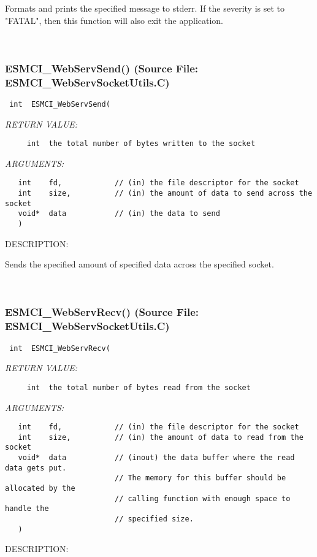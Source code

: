       Formats and prints the specified message to stderr.  If the severity
      is set to "FATAL", then this function will also exit the application.
   
 
\mbox{}\hrulefill\
 
\subsubsection{ESMCI\_WebServSend() (Source File: ESMCI\_WebServSocketUtils.C)}


  
\begin{verbatim} int  ESMCI_WebServSend(\end{verbatim}{\em RETURN VALUE:}
\begin{verbatim}     int  the total number of bytes written to the socket\end{verbatim}{\em ARGUMENTS:}
\begin{verbatim}   int    fd,            // (in) the file descriptor for the socket
   int    size,          // (in) the amount of data to send across the socket
   void*  data           // (in) the data to send
   )\end{verbatim}
{\sf DESCRIPTION:\\ }


      Sends the specified amount of specified data across the specified
      socket.
   
 
\mbox{}\hrulefill\
 
\subsubsection{ESMCI\_WebServRecv() (Source File: ESMCI\_WebServSocketUtils.C)}


  
\begin{verbatim} int  ESMCI_WebServRecv(\end{verbatim}{\em RETURN VALUE:}
\begin{verbatim}     int  the total number of bytes read from the socket\end{verbatim}{\em ARGUMENTS:}
\begin{verbatim}   int    fd,            // (in) the file descriptor for the socket
   int    size,          // (in) the amount of data to read from the socket
   void*  data           // (inout) the data buffer where the read data gets put.
                         // The memory for this buffer should be allocated by the
                         // calling function with enough space to handle the
                         // specified size.
   )\end{verbatim}
{\sf DESCRIPTION:\\ }


